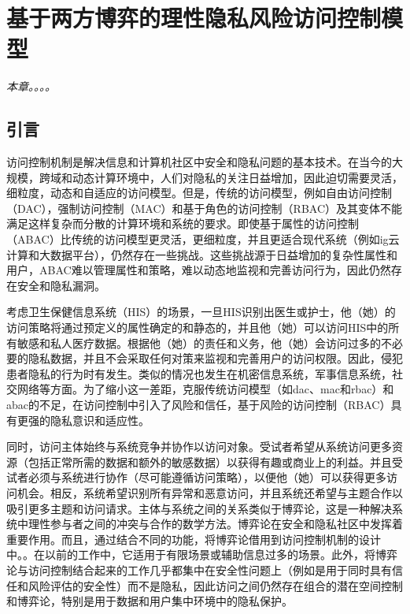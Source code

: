 \chapter{基于两方博弈的理性隐私风险访问控制模型}
\label{chap:game-theoretical-RaBAC-for-privacy}

\textit{本章。。。。}

\section{引言}

访问控制机制是解决信息和计算机社区中安全和隐私问题的基本技术。在当今的大规模，跨域和动态计算环境中，人们对隐私的关注日益增加，因此迫切需要灵活，细粒度，动态和自适应的访问模型。但是，传统的访问模型，例如自由访问控制（DAC）\cite{lampson1974protection}，强制访问控制（MAC）\cite{bell1973secure}和基于角色的访问控制（RBAC）\cite{sandhu1996role}及其变体不能满足这样复杂而分散的计算环境和系统的要求。即使基于属性的访问控制（ABAC）\cite{kuhn2010}比传统的访问模型更灵活，更细粒度，并且更适合现代系统（例如ig云计算和大数据平台），仍然存在一些挑战\cite{servos2017,paci2018}。这些挑战源于日益增加的复杂性属性和用户，ABAC难以管理属性和策略，难以动态地监视和完善访问行为，因此仍然存在安全和隐私漏洞。

考虑卫生保健信息系统（HIS）的场景，一旦HIS识别出医生或护士，他（她）的访问策略将通过预定义的属性确定的和静态的，并且他（她）可以访问HIS中的所有敏感和私人医疗数据。根据他（她）的责任和义务，他（她）会访问过多的不必要的隐私数据，并且不会采取任何对策来监视和完善用户的访问权限。因此，侵犯患者隐私的行为时有发生。类似的情况也发生在机密信息系统，军事信息系统，社交网络等方面。为了缩小这一差距，克服传统访问模型（如dac、mac和rbac）和abac的不足，在访问控制中引入了风险\cite{cheng2007fuzzy, zhang2018privacy}和信任\cite{dimmock2004, pustchi2015}，基于风险的访问控制（RBAC）\cite{cheng2007fuzzy}具有更强的隐私意识和适应性\cite{ni2010risk, wang2011quantified, zhang2018privacy}。


同时，访问主体始终与系统竞争并协作以访问对象。受试者希望从系统访问更多资源（包括正常所需的数据和额外的敏感数据）以获得有趣或商业上的利益。并且受试者必须与系统进行协作（尽可能遵循访问策略），以便他（她）可以获得更多访问机会。相反，系统希望识别所有异常和恶意访问，并且系统还希望与主题合作以吸引更多主题和访问请求。主体与系统之间的关系类似于博弈论\cite{nash1950}，这是一种解决系统中理性参与者之间的冲突与合作的数学方法。博弈论在安全和隐私社区中发挥着重要作用\cite{do2017,zhu2018,tian2019}。而且，通过结合不同的功能，将博弈论借用到访问控制机制的设计中。\cite{hu2014,zhang2015,liu2016,gao2018, helil2017}。在以前的工作中，它适用于有限场景\cite{hu2014,gao2018}或辅助信息过多的场景\cite{zhang2015,liu2016,helil2017}。此外，将博弈论与访问控制结合起来的工作几乎都集中在安全性问题上（例如\cite{helil2017}是用于同时具有信任和风险评估的安全性）而不是隐私，因此访问之间仍然存在组合的潜在空间控制和博弈论，特别是用于数据和用户集中环境中的隐私保护。

